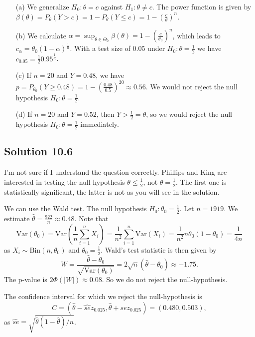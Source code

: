 \begin{itemize}
    \item[(a)] We generalize $H_0: \theta = c$ against $H_1: \theta \neq c$.
        The power function is given by $\beta(\theta) = P_{\theta}(Y > c) = 1 - P_{\theta}(Y \leq c) = 1 - \left(\frac{c}{\theta}\right)^n$.
    \item[(b)] We calculate $\alpha = \sup_{\theta \in \Theta_0} \beta(\theta) = 1 - \left(\frac{c}{\theta_0}\right)^n$, which leads to $c_{\alpha} = \theta_0(1 - \alpha)^{\frac{1}{n}}$.
        With a test size of $0.05$ under $H_0: \theta = \frac{1}{2}$ we have $c_{0.05} = \frac{1}{2} 0.95^{\frac{1}{n}}$.
    \item[(c)] If $n = 20$ and $Y = 0.48$, we have $p = P_{\theta_0}(Y \geq 0.48) = 1 - \left(\frac{0.48}{0.5}\right)^{20} \approx 0.56$.
        We would not reject the null hypothesis $H_0: \theta = \frac{1}{2}$.
    \item[(d)] If $n = 20$ and $Y = 0.52$, then $Y > \frac{1}{2} = \theta$, so we would reject the null hypothesis $H_0: \theta = \frac{1}{2}$ immediately.
\end{itemize}


\subsection*{Solution 10.6}

I'm not sure if I understand the question correctly.
Phillips and King are interested in testing the null hypothesis $\theta \leq \frac{1}{2}$, not $\theta = \frac{1}{2}$.
The first one is statistically significant, the latter is not as you will see in the solution.

We can use the Wald test.
The null hypothesis $H_0: \theta_0 = \frac{1}{2}$.
Let $n = 1919$.
We estimate $\hat{\theta} = \frac{922}{n} \approx 0.48$.
Note that
$$
\mathrm{Var}(\theta_0)
    = \mathrm{Var}(\frac{1}{n} \sum_{i=1}^n X_i)
    = \frac{1}{n^2} \sum_{i=1}^n \mathrm{Var}(X_i)
    = \frac{1}{n^2} n \theta_0 (1 - \theta_0)
    = \frac{1}{4n}
$$
as $X_i \sim \mathrm{Bin}(n, \theta_0)$ and $\theta_0 = \frac{1}{2}$.
Wald's test statistic is then given by
$$
W = \frac{\hat{\theta} - \theta_0}{\sqrt{\mathrm{Var}(\theta_0)}}
    = 2\sqrt{n} (\hat{\theta} - \theta_0)
    \approx -1.75.
$$
The p-value is $2\Phi(|W|) \approx 0.08$.
So we do not reject the null-hypothesis.

The confidence interval for which we reject the null-hypothesis is
$$
C = (\hat{\theta} - \hat{se} z_{0.025}, \hat{\theta} + \hat{se} z_{0.025})
    = (0.480, 0.503),
$$
as $\hat{se} = \sqrt{\hat{\theta}(1 - \hat{\theta})/n}$.

